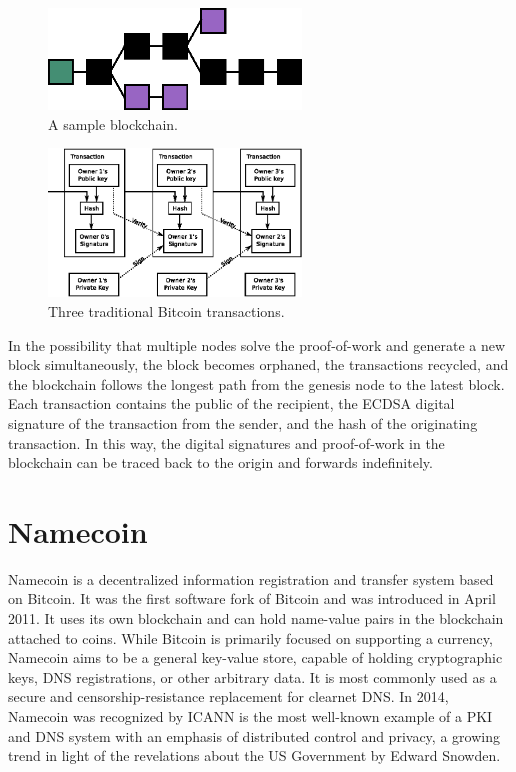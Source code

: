 \begin{figure}[htbp]
	\centering
	\includegraphics[width=0.6\textwidth]{images/Blockchain-2.eps}
	\caption{A sample blockchain.}
	\label{fig:figure6}
\end{figure}

\begin{figure}[htbp]
	\centering
	\includegraphics[width=0.6\textwidth]{images/bitcoin_transaction.eps}
	\caption{Three traditional Bitcoin transactions.}
	\label{fig:figure7}
\end{figure}

In the possibility that multiple nodes solve the proof-of-work and generate a new block simultaneously, the block becomes orphaned, the transactions recycled, and the blockchain follows the longest path from the genesis node to the latest block. Each transaction contains the public of the recipient, the ECDSA digital signature of the transaction from the sender, and the hash of the originating transaction. In this way, the digital signatures and proof-of-work in the blockchain can be traced back to the origin and forwards indefinitely. %





\section{Namecoin}

Namecoin is a decentralized information registration and transfer system based on Bitcoin. It was the first software fork of Bitcoin and was introduced in April 2011. It uses its own blockchain and can hold name-value pairs in the blockchain attached to coins. While Bitcoin is primarily focused on supporting a currency, Namecoin aims to be a general key-value store, capable of holding cryptographic keys, DNS registrations, or other arbitrary data. It is most commonly used as a secure and censorship-resistance replacement for clearnet DNS. In 2014, Namecoin was recognized by ICANN is the most well-known example of a PKI and DNS system with an emphasis of distributed control and privacy, a growing trend in light of the revelations about the US Government by Edward Snowden. %

